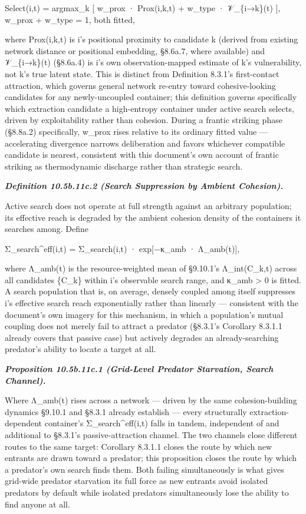 \documentclass[
]{article}
\begin{document}
Select(i,t) = argmax\_k {[} w\_prox · Prox(i,k,t) + w\_type ·
𝒱\_\{i→k\}(t) {]}, w\_prox + w\_type = 1, both fitted,

where Prox(i,k,t) is i's positional proximity to candidate k (derived
from existing network distance or positional embedding, §8.6a.7, where
available) and 𝒱\_\{i→k\}(t) (§8.6a.4) is i's own observation-mapped
estimate of k's vulnerability, not k's true latent state. This is
distinct from Definition 8.3.1's first-contact attraction, which governs
general network re-entry toward cohesive-looking candidates for any
newly-uncoupled container; this definition governs specifically which
extraction candidate a high-entropy container under active search
selects, driven by exploitability rather than cohesion. During a frantic
striking phase (§8.8a.2) specifically, w\_prox rises relative to its
ordinary fitted value --- accelerating divergence narrows deliberation
and favors whichever compatible candidate is nearest, consistent with
this document's own account of frantic striking as thermodynamic
discharge rather than strategic search.

\emph{\textbf{Definition 10.5b.11c.2 (Search Suppression by Ambient
Cohesion).}}

Active search does not operate at full strength against an arbitrary
population; its effective reach is degraded by the ambient cohesion
density of the containers it searches among. Define

Σ\_search\^{}eff(i,t) = Σ\_search(i,t) · exp{[}−κ\_amb · Λ\_amb(t){]},

where Λ\_amb(t) is the resource-weighted mean of §9.10.1's
Λ\_int(C\_k,t) across all candidates \{C\_k\} within i's observable
search range, and κ\_amb \textgreater{} 0 is fitted. A search population
that is, on average, densely coupled among itself suppresses i's
effective search reach exponentially rather than linearly --- consistent
with the document's own imagery for this mechanism, in which a
population's mutual coupling does not merely fail to attract a predator
(§8.3.1's Corollary 8.3.1.1 already covers that passive case) but
actively degrades an already-searching predator's ability to locate a
target at all.

\emph{\textbf{Proposition 10.5b.11c.1 (Grid-Level Predator Starvation,
Search Channel).}}

Where Λ\_amb(t) rises across a network --- driven by the same
cohesion-building dynamics §9.10.1 and §8.3.1 already establish ---
every structurally extraction-dependent container's
Σ\_search\^{}eff(i,t) falls in tandem, independent of and additional to
§8.3.1's passive-attraction channel. The two channels close different
routes to the same target: Corollary 8.3.1.1 closes the route by which
new entrants are drawn toward a predator; this proposition closes the
route by which a predator's own search finds them. Both failing
simultaneously is what gives grid-wide predator starvation its full
force as new entrants avoid isolated predators by default while isolated
predators simultaneously lose the ability to find anyone at all.
\end{document}
